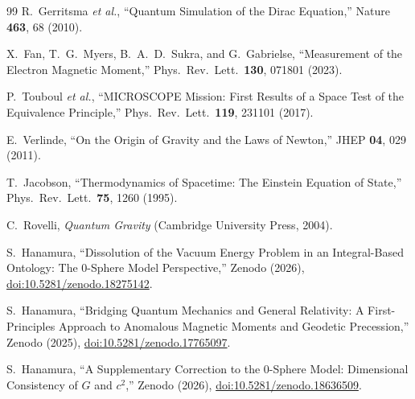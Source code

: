 \documentclass[%
 reprint,
 amsmath,amssymb,
 aps,
 prb,
]{revtex4-2}
\numberwithin{equation}{section}
\begin{document}
\begin{thebibliography}{99}
R.~Gerritsma \emph{et al.},
``Quantum Simulation of the Dirac Equation,''
Nature \textbf{463}, 68 (2010).

X.~Fan, T.~G.~Myers, B.~A.~D.~Sukra, and G.~Gabrielse,
``Measurement of the Electron Magnetic Moment,''
Phys.\ Rev.\ Lett.\ \textbf{130}, 071801 (2023).

P.~Touboul \emph{et al.},
``MICROSCOPE Mission: First Results of a Space Test of the Equivalence Principle,''
Phys.\ Rev.\ Lett.\ \textbf{119}, 231101 (2017).

E.~Verlinde,
``On the Origin of Gravity and the Laws of Newton,''
JHEP \textbf{04}, 029 (2011).

T.~Jacobson,
``Thermodynamics of Spacetime: The Einstein Equation of State,''
Phys.\ Rev.\ Lett.\ \textbf{75}, 1260 (1995).

C.~Rovelli,
\emph{Quantum Gravity} (Cambridge University Press, 2004).

S.~Hanamura,
``Dissolution of the Vacuum Energy Problem in an Integral-Based Ontology: The 0-Sphere Model Perspective,''
Zenodo (2026), \href{https://doi.org/10.5281/zenodo.18275142}{doi:10.5281/zenodo.18275142}.

S.~Hanamura,
``Bridging Quantum Mechanics and General Relativity: A First-Principles Approach to Anomalous Magnetic Moments and Geodetic Precession,''
Zenodo (2025), \href{https://doi.org/10.5281/zenodo.17765097}{doi:10.5281/zenodo.17765097}.

S.~Hanamura,
``A Supplementary Correction to the 0-Sphere Model: Dimensional Consistency of $G$ and $c^2$,''
Zenodo (2026), \href{https://doi.org/10.5281/zenodo.18636509}{doi:10.5281/zenodo.18636509}.

\end{thebibliography}
\end{document}
